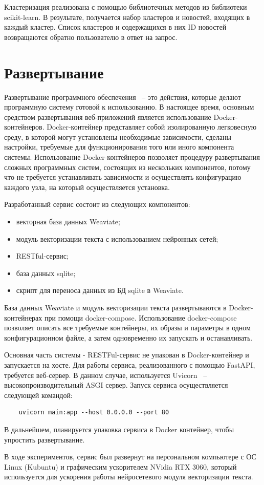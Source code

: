 Кластеризация реализована с помощью библиотечных методов из библиотеки scikit-learn. В результате, получается набор кластеров и новостей, входящих в каждый кластер. Список кластеров и содержащихся в них ID новостей возвращаются обратно пользователю в ответ на запрос.

\section{Развертывание}

Развертывание программного обеспечения ~-- это действия, которые делают программную систему готовой к использованию. В настоящее время, основным средством развертывания веб-приложений является использование Docker-контейнеров. Docker-контейнер представляет собой изолированную легковесную среду, в которой могут установлены необходимые зависимости, сделаны настройки, требуемые для функционирования того или иного компонента системы. Использование Docker-контейнеров позволяет процедуру развертывания  сложных программных систем, состоящих из нескольких компонентов, потому что не требуется устанавливать зависимости и осуществлять конфигурацию каждого узла, на который осуществляется установка.

Разработанный сервис состоит из следующих компонентов:
\begin{itemize}
    \item векторная база данных Weaviate;
    \item модуль векторизации текста с использованием нейронных сетей;
    \item RESTful-сервис;
    \item база данных sqlite;
    \item скрипт для переноса данных из БД sqlite в Weaviate.
\end{itemize}

База данных Weaviate и модуль векторизации текста развертываются в Docker-контейнерах при помощи docker-compose. Использование docker-compose позволяет описать все требуемые контейнеры, их образы и параметры в одном конфигурационном файле, а затем одновременно их запускать и останавливать.

Основная часть системы - RESTFul-сервис не упакован в Docker-контейнер и запускается на хосте. Для работы сервиса, реализованного с помощью FastAPI, требуется веб-сервер. В данном случае, используется Uvicorn ~-- высокопроизводительный ASGI сервер. Запуск сервиса осуществляется следующей командой:

\begin{lstlisting}
    uvicorn main:app --host 0.0.0.0 --port 80
\end{lstlisting}

В дальнейшем, планируется упаковка сервиса в Docker контейнер, чтобы упростить развертывание.

В ходе экспериментов, сервис был развернут на персональном компьютере с ОС Linux (Kubuntu) и графическим ускорителем NVidia RTX 3060, который используется для ускорения работы нейросетевого модуля векторизации текста.
